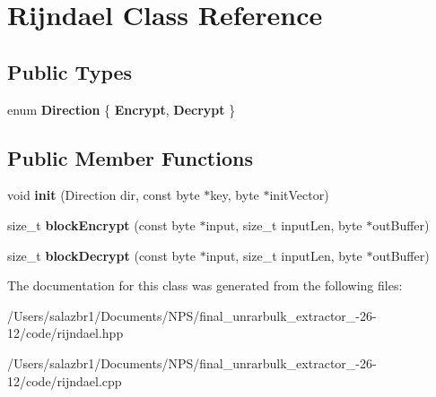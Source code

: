 \hypertarget{class_rijndael}{\section{Rijndael Class Reference}
\label{class_rijndael}
}
\subsection*{Public Types}
\begin{DoxyCompactItemize}
\item 
enum {\bfseries Direction} \{ {\bfseries Encrypt}, 
{\bfseries Decrypt}
 \}
\end{DoxyCompactItemize}
\subsection*{Public Member Functions}
\begin{DoxyCompactItemize}
\item 
\hypertarget{class_rijndael_a4f07601b925a7eff472e4e2dc4ee1f06}{void {\bfseries init} (Direction dir, const byte $\ast$key, byte $\ast$init\-Vector)}\label{class_rijndael_a4f07601b925a7eff472e4e2dc4ee1f06}

\item 
\hypertarget{class_rijndael_ac105e87a43362d92865565c27a2c509d}{size\-\_\-t {\bfseries block\-Encrypt} (const byte $\ast$input, size\-\_\-t input\-Len, byte $\ast$out\-Buffer)}\label{class_rijndael_ac105e87a43362d92865565c27a2c509d}

\item 
\hypertarget{class_rijndael_a3104a56aacfd053262f845fede98d4b6}{size\-\_\-t {\bfseries block\-Decrypt} (const byte $\ast$input, size\-\_\-t input\-Len, byte $\ast$out\-Buffer)}\label{class_rijndael_a3104a56aacfd053262f845fede98d4b6}

\end{DoxyCompactItemize}


The documentation for this class was generated from the following files\-:\begin{DoxyCompactItemize}
\item 
/\-Users/salazbr1/\-Documents/\-N\-P\-S/final\-\_\-unrarbulk\-\_\-extractor\-\_-\/26-\/12/code/rijndael.\-hpp\item 
/\-Users/salazbr1/\-Documents/\-N\-P\-S/final\-\_\-unrarbulk\-\_\-extractor\-\_-\/26-\/12/code/rijndael.\-cpp\end{DoxyCompactItemize}
